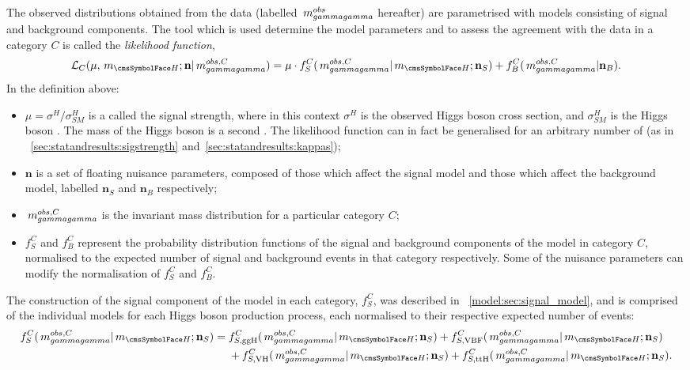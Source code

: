 The observed \mgg distributions obtained from the data (labelled $ \,m_{gammagamma}^{obs}$ hereafter) are parametrised with models consisting of signal and background components. The tool which is used determine the model parameters and to assess the agreement with the data in a category $C$ is called the \emph{likelihood function},
\begin{equation}
\label{eq:statandresults:likelihood_function}
\mathcal{L}_C(\mu, \mH; \mathbf{n} | \mgg^{obs,C} ) = \mu \cdot f^C_S(\mgg^{obs,C} |\mH; \mathbf{n}_S) + f^C_B(\mgg^{obs,C} | \mathbf{n}_B ). 
\end{equation}
In the definition above:
\begin{itemize}
\item $\mu = \sigma^{H} / \sigma^{H}_{SM}$ is a \POI called the signal strength, where in this context $\sigma^H$ is the observed Higgs boson cross section, and $\sigma^H_{SM}$ is the \SM Higgs boson \crosssection. The mass of the Higgs boson \mH is a second \POI. The likelihood function can in fact be generalised for an arbitrary number of \POI\s (as in \Sec\s~\ref{sec:statandresults:sigstrength} and~\ref{sec:statandresults:kappas}); 
\item $\mathbf{n}$ is a set of floating nuisance parameters, composed of those which affect the signal model and those which affect the background model, labelled $\mathbf{n}_S$ and $\mathbf{n}_B$ respectively;
\item $\,m_{gammagamma}^{obs,C}$ is the invariant mass distribution for a particular category $C$;
\item $f^C_S$ and $f^C_B$ represent the probability distribution functions of the signal and background components of the model in category $C$, normalised to the expected number of signal and background events in that category respectively. Some of the nuisance parameters can modify the normalisation of $f^C_S$ and $f^C_B$. 
\end{itemize}

The construction of the signal component of the model in each category, $f^C_S$, was described in \Sec~\ref{model:sec:signal_model}, and is comprised of the individual models for each Higgs boson production process, each normalised to their respective expected number of events:
\begin{equation}
\label{eq:statandresults:f_s_breakdown}
\begin{split}
 f^C_S(\mgg^{obs,C} |\mH; \mathbf{n}_S) ={} & f^C_{S,{\text{ggH}}}(\mgg^{obs,C} |\mH; \mathbf{n}_S)  + f^C_{S,{\text{VBF}}}(\mgg^{obs,C} |\mH; \mathbf{n}_S)\\
  & + f^C_{S,{\text{VH}}}(\mgg^{obs,C} |\mH; \mathbf{n}_S)+ f^C_{S,{\text{ttH}}}(\mgg^{obs,C} |\mH; \mathbf{n}_S).\\
\end{split}
\end{equation}

